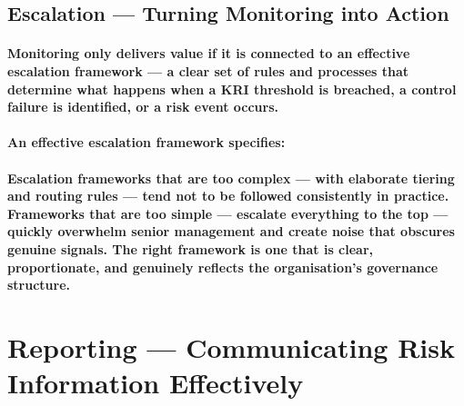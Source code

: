 \subsection{Escalation — Turning Monitoring into Action}
\paragraph{Monitoring only delivers value if it is connected to an effective escalation framework — a clear set of rules and processes that determine what happens when a KRI threshold is breached, a control failure is identified, or a risk event occurs.}
\paragraph{An effective escalation framework specifies:}
\begin{itemize}
\end{itemize}
\paragraph{Escalation frameworks that are too complex — with elaborate tiering and routing rules — tend not to be followed consistently in practice. Frameworks that are too simple — escalate everything to the top — quickly overwhelm senior management and create noise that obscures genuine signals. The right framework is one that is clear, proportionate, and genuinely reflects the organisation's governance structure.}

\section{Reporting — Communicating Risk Information Effectively}
